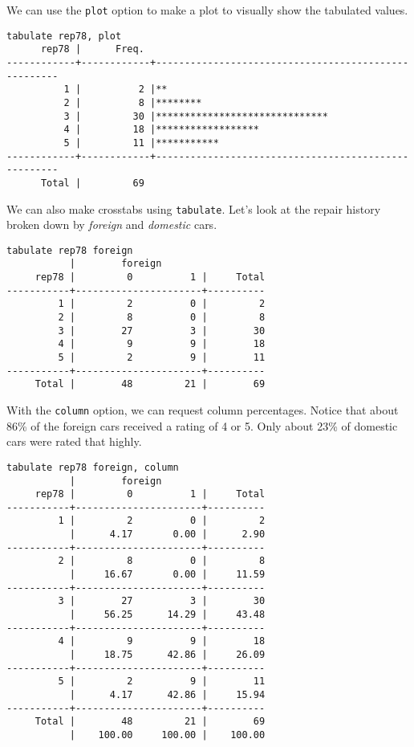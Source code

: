 We can use the \lstinline{plot} option to make a plot to visually show the tabulated values.

\begin{lstlisting}
tabulate rep78, plot
      rep78 |      Freq.
------------+------------+-----------------------------------------------------
          1 |          2 |**
          2 |          8 |********
          3 |         30 |******************************
          4 |         18 |******************
          5 |         11 |***********
------------+------------+-----------------------------------------------------
      Total |         69
\end{lstlisting}

We can also make crosstabs using \lstinline{tabulate}. Let\rq{}s look at the repair history broken down by \textit{foreign} and \textit{domestic} cars.

\begin{lstlisting}
tabulate rep78 foreign
           |        foreign
     rep78 |         0          1 |     Total
-----------+----------------------+----------
         1 |         2          0 |         2
         2 |         8          0 |         8
         3 |        27          3 |        30
         4 |         9          9 |        18
         5 |         2          9 |        11
-----------+----------------------+----------
     Total |        48         21 |        69
\end{lstlisting}

With the \lstinline{column} option, we can request column percentages. Notice that about 86\% of the foreign cars received a rating of 4 or 5. Only about 23\% of domestic cars were rated that highly.

\begin{lstlisting}
tabulate rep78 foreign, column
           |        foreign
     rep78 |         0          1 |     Total
-----------+----------------------+----------
         1 |         2          0 |         2
           |      4.17       0.00 |      2.90
-----------+----------------------+----------
         2 |         8          0 |         8
           |     16.67       0.00 |     11.59
-----------+----------------------+----------
         3 |        27          3 |        30
           |     56.25      14.29 |     43.48
-----------+----------------------+----------
         4 |         9          9 |        18
           |     18.75      42.86 |     26.09
-----------+----------------------+----------
         5 |         2          9 |        11
           |      4.17      42.86 |     15.94
-----------+----------------------+----------
     Total |        48         21 |        69
           |    100.00     100.00 |    100.00
\end{lstlisting}

